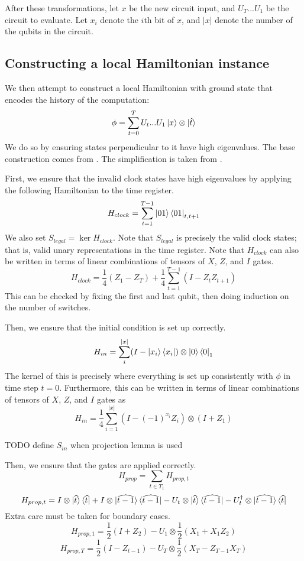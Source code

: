 After these transformations, let $x$ be the new circuit input, and $U_T...U_1$ be the circuit to evaluate. Let $x_i$ denote the $i$th bit of $x$, and $|x|$ denote the number of the qubits in the circuit.

\subsection{Constructing a local Hamiltonian instance}

We then attempt to construct a local Hamiltonian with ground state that encodes the history of the computation: $$\phi=\sum_{t=0}^TU_t...U_1\ket{x}\otimes\ket{\hat{t}}$$
We do so by ensuring states perpendicular to it have high eigenvalues. The base construction comes from \cite{kitaev2002classical}. The simplification is taken from \cite{PhysRevA.78.012352}.

First, we ensure that the invalid clock states have high eigenvalues by applying the following Hamiltonian to the time register.
$$H_{clock}=\sum_{t=1}^{T-1}\ket{01}\bra{01}_{t,t+1}$$
We also set $S_{legal}=\ker H_{clock}$. Note that $S_{legal}$ is precisely the valid clock states; that is, valid unary representations in the time register. Note that $H_{clock}$ can also be written in terms of linear combinations of tensors of $X$, $Z$, and $I$ gates.
$$H_{clock}=\frac{1}{4}(Z_1 - Z_T) + \frac{1}{4}\sum_{t=1}^{T-1}(I-Z_tZ_{t+1}) $$
This can be checked by fixing the first and last qubit, then doing induction on the number of switches.

Then, we ensure that the initial condition is set up correctly.
$$H_{in}=\sum_i^{|x|}(I-\ket{x_i}\bra{x_i})\otimes\ket{0}\bra{0}_1$$
The kernel of this is precisely where everything is set up consistently with $\phi$ in time step $t=0$. Furthermore, this can be written in terms of linear combinations of tensors of $X$, $Z$, and $I$ gates as
$$H_{in}=\frac{1}{4}\sum_{i=1}^{|x|}(I-(-1)^{x_i}Z_i)\otimes(I+Z_1)$$

TODO define $S_{in}$ when projection lemma is used

Then, we ensure that the gates are applied correctly.
$$H_{prop}=\sum_{t\in T_1}H_{prop,t}$$
$$H_{prop,t}=I\otimes\ket{\widehat{t}}\bra{\widehat{t}}
	+I\otimes\ket{\widehat{t-1}}\bra{\widehat{t-1}}
	-U_t\otimes\ket{\widehat{t}}\bra{\widehat{t-1}}
	-U_t^\dagger\otimes\ket{\widehat{t-1}}\bra{\widehat{t}}$$
Extra care must be taken for boundary cases.
$$H_{prop,1}=\frac{1}{2}(I+Z_2)-U_1\otimes\frac{1}{2}(X_1+X_1Z_2)$$
$$H_{prop,T}=\frac{1}{2}(I-Z_{t-1})-U_T\otimes\frac{1}{2}(X_T-Z_{T-1}X_T)$$


